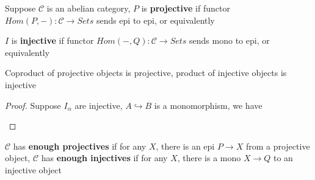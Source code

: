 \documentclass[../main.tex]{subfiles}
\begin{document}
\begin{definition}
Suppose $\mathscr C$ is an abelian category, $P$ is \textbf{projective} if functor $Hom(P,-):\mathscr C\to Sets$ sends epi to epi, or equivalently
\begin{center}
\end{center}
$I$ is \textbf{injective} if functor $Hom(-,Q):\mathscr C\to Sets$ sends mono to epi, or equivalently
\begin{center}
\end{center}
\end{definition}

\begin{lemma}\label{Coproduct of projetives is projective, product of injectives is injective}
Coproduct of projective objects is projective, product of injective objects is injective
\end{lemma}

\begin{proof}
Suppose $I_\alpha$ are injective, $A\hookrightarrow B$ is a monomorphism, we have
\begin{center}
\end{center}
\end{proof}

\begin{definition}
$\mathscr C$ has \textbf{enough projectives} if for any $X$, there is an epi $P\to X$ from a projective object, $\mathscr C$ has \textbf{enough injectives} if for any $X$, there is a mono $X\to Q$ to an injective object
\end{definition}
\end{document}
